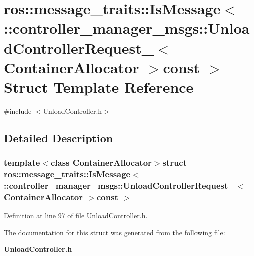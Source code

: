\section{ros\-:\-:message\-\_\-traits\-:\-:\-Is\-Message$<$ \-:\-:controller\-\_\-manager\-\_\-msgs\-:\-:\-Unload\-Controller\-Request\-\_\-$<$ \-Container\-Allocator $>$const $>$ \-Struct \-Template \-Reference}
\label{structros_1_1message__traits_1_1IsMessage_3_01_1_1controller__manager__msgs_1_1UnloadControllerRedbbb6668ca4030f8ec8525a8d525793}


{\ttfamily \#include $<$\-Unload\-Controller.\-h$>$}



\subsection{\-Detailed \-Description}
\subsubsection*{template$<$class Container\-Allocator$>$struct ros\-::message\-\_\-traits\-::\-Is\-Message$<$ \-::controller\-\_\-manager\-\_\-msgs\-::\-Unload\-Controller\-Request\-\_\-$<$ Container\-Allocator $>$const  $>$}



\-Definition at line 97 of file \-Unload\-Controller.\-h.



\-The documentation for this struct was generated from the following file\-:\begin{DoxyCompactItemize}
\item 
{\bf \-Unload\-Controller.\-h}\end{DoxyCompactItemize}
